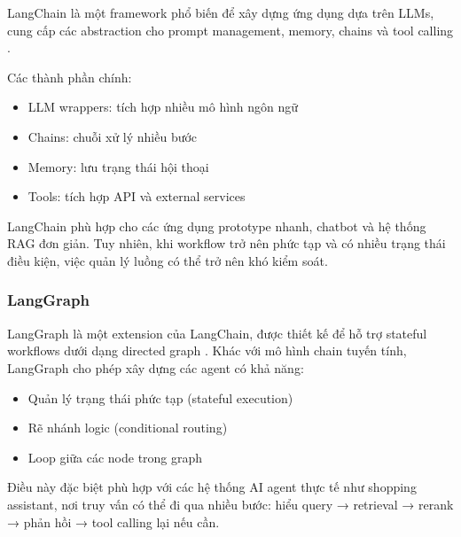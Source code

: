 LangChain là một framework phổ biến để xây dựng ứng dụng dựa trên LLMs, cung cấp các abstraction cho prompt management, memory, chains và tool calling \parencite{langchain2024docs}.

Các thành phần chính:
\begin{itemize}
    \item LLM wrappers: tích hợp nhiều mô hình ngôn ngữ
    \item Chains: chuỗi xử lý nhiều bước
    \item Memory: lưu trạng thái hội thoại
    \item Tools: tích hợp API và external services
\end{itemize}

LangChain phù hợp cho các ứng dụng prototype nhanh, chatbot và hệ thống RAG đơn giản. Tuy nhiên, khi workflow trở nên phức tạp và có nhiều trạng thái điều kiện, việc quản lý luồng có thể trở nên khó kiểm soát.


\subsubsection{LangGraph}

LangGraph là một extension của LangChain, được thiết kế để hỗ trợ stateful workflows dưới dạng directed graph \parencite{langgraph2024docs}. Khác với mô hình chain tuyến tính, LangGraph cho phép xây dựng các agent có khả năng:

\begin{itemize}
    \item Quản lý trạng thái phức tạp (stateful execution)
    \item Rẽ nhánh logic (conditional routing)
    \item Loop giữa các node trong graph
\end{itemize}

Điều này đặc biệt phù hợp với các hệ thống AI agent thực tế như shopping assistant, nơi truy vấn có thể đi qua nhiều bước: hiểu query → retrieval → rerank → phản hồi → tool calling lại nếu cần.


